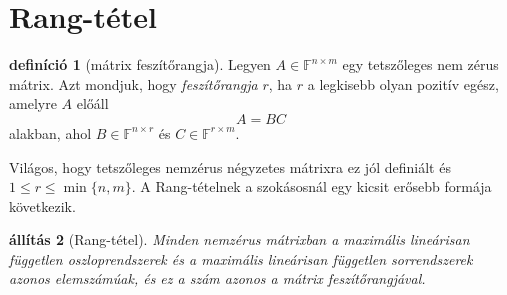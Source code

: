 \documentclass[a4paper, showtrims]{memoir}
\theoremstyle{plain}
\newtheorem{proposition}{állítás}[chapter]
\theoremstyle{remark}
\theoremstyle{definition}
\newtheorem{definition}[proposition]{definíció}
\begin{document}
\section{Rang-tétel}
\begin{definition}[mátrix feszítőrangja]
	Legyen $A\in\mathbb{F}^{n\times m}$ egy tetszőleges nem zérus mátrix.
    Azt mondjuk, hogy \emph{feszítőrangja} $r$, ha $r$ a legkisebb olyan pozitív egész, amelyre $A$ előáll
	\[
		A=BC
	\]
	alakban, ahol $B\in\mathbb{F}^{n\times r}$ és $C\in\mathbb{F}^{r\times m}$.
\end{definition}
Világos, hogy tetszőleges nemzérus négyzetes mátrixra ez jól definiált és $1\leq r \leq \min\{n,m\}$.
A Rang-tételnek a szokásosnál egy kicsit erősebb formája következik.

\begin{proposition}[Rang-tétel]
	Minden nemzérus mátrixban
	a maximális lineárisan független oszloprendszerek
	és a max\-i\-má\-lis lineárisan független sorrendszerek azonos elemszámúak,
	és ez a szám azonos a mátrix feszítőrangjával.
    \label{pr:rang}
\end{proposition}
\end{document}
